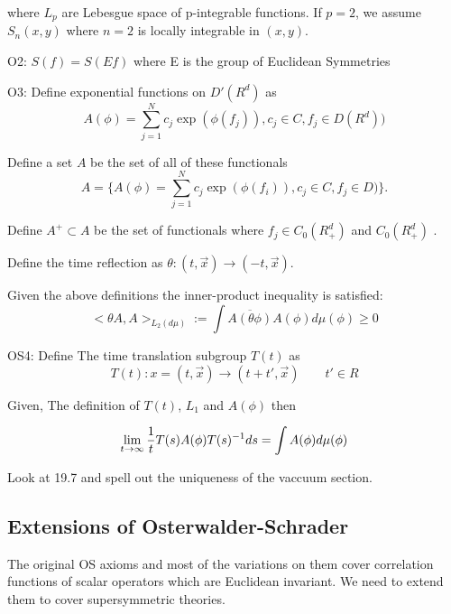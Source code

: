 \documentclass{article}
\begin{document}
where $L_p$ are Lebesgue space of p-integrable functions.
If \(p=2\), we assume $S_n(x,y)$ where $n=2$ is locally integrable in $(x,y)$.

 O2: $S(f)= S(Ef)$ where E is the group of Euclidean Symmetries

 O3: Define exponential functions on $D'(R^d)$ as
    \begin{equation}
         A(\phi)= \sum_{j=1}^N c_j \exp (\phi(f_j)), c_j \in C, f_j \in D(R^d))
    \end{equation}

Define a set $A$ be the set of all of these functionals
      \begin{equation}
        A = \{ A(\phi)= \sum_{j=1}^N c_j \exp (\phi(f_i)), c_j \in C, f_j \in D)\}.
    \end{equation}
     

   Define $A^+ \subset  A $ be the set of functionals where $f_j \in C_0(R_{+}^d)$ and $C_0(R_{+}^d)$ .
   
   Define the time reflection as $\theta: (t , \vec{x}) \rightarrow (-t, \vec{x})$. 
   
   Given the above definitions the inner-product inequality is satisfied:  
     \begin{equation}
         < \theta A, A >_{L_2(d \mu)}:= \int \overline{A(\theta \phi)} A(\phi) d \mu(\phi)\geq 0 
     \end{equation}
     
   OS4: 
   Define The time translation subgroup $T(t)$ as 
    \begin{equation}
        T(t) : x = (t, \vec{x})\rightarrow (t+ t', \vec{x}) \qquad t'\in R 
    \end{equation}


Given, The definition of $T(t)$, $L_1$ and $A(\phi)$ then 

\begin{equation}
    \lim_{t \rightarrow \infty} {1 \over t} T(s) A(\phi) T(s)^{-1} ds = \int A (\phi) d \mu(\phi)
\end{equation}

 Look at 19.7 and spell out the uniqueness of the vaccuum section. 



\subsection{Extensions of Osterwalder-Schrader}

The original OS axioms and most of the variations on them cover correlation functions of scalar operators which
are Euclidean invariant.  We need to extend them to cover supersymmetric theories.
\end{document}
